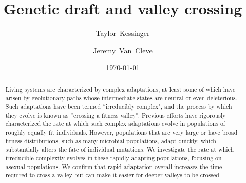 \documentclass[rmp]{revtex4}
\begin{document}
\title{Genetic draft and valley crossing}
\author{Taylor~Kessinger}
\author{Jeremy~Van~Cleve}


\date{\today}

\begin{abstract}

Living systems are characterized by complex adaptations, at least some of which have arisen by evolutionary paths whose intermediate states are neutral or even deleterious.
Such adaptations have been termed ``irreducibly complex", and the process by which they evolve is known as ``crossing a fitness valley".
Previous efforts have rigorously characterized the rate at which such complex adaptations evolve in populations of roughly equally fit individuals.
However, populations that are very large or have broad fitness distributions, such as many microbial populations, adapt quickly, which substantially alters the fate of individual mutations.
We investigate the rate at which irreducible complexity evolves in these rapidly adapting populations, focusing on asexual populations.
We confirm that rapid adaptation overall increases the time required to cross a valley but can make it easier for deeper valleys to be crossed.
\end{abstract}

\maketitle
\end{document}
